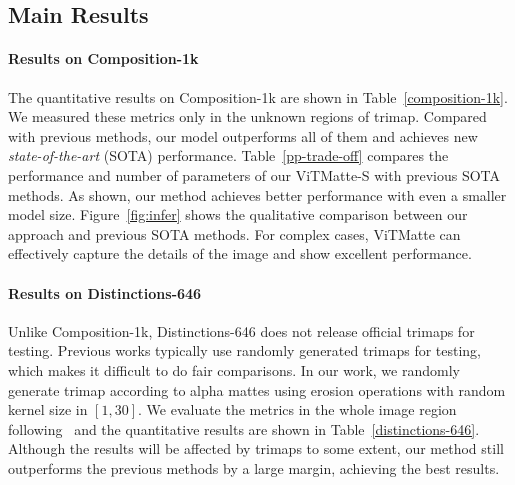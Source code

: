 \documentclass[10pt,twocolumn,letterpaper]{article}
\newcommand{\thename}{ViTMatte}
\begin{document}
\subsection{Main Results}
\paragraph{Results on Composition-1k} The quantitative results on Composition-1k are shown in Table~\ref{composition-1k}. We measured these metrics only in the unknown regions of trimap. Compared with previous methods, our model outperforms all of them and achieves new \emph{state-of-the-art} (SOTA) performance. Table~\ref{pp-trade-off} compares the performance and number of parameters of our \thename-S with previous SOTA methods. As shown, our method achieves better performance with even a smaller model size. Figure~\ref{fig:infer} shows the qualitative comparison between our approach and previous SOTA methods. For complex cases, \thename{} can effectively capture the details of the image and show excellent performance. 

\paragraph{Results on Distinctions-646} Unlike Composition-1k, Distinctions-646 does not release official trimaps for testing. Previous works typically use randomly generated trimaps for testing, which makes it difficult to do fair comparisons. In our work, we randomly generate trimap according to alpha mattes using erosion operations with random kernel size in $[1, 30]$.  We evaluate the metrics in the whole image region following~\cite{HAttMatting} and the quantitative results are shown in Table~\ref{distinctions-646}. Although the results will be affected by trimaps to some extent, our method still outperforms the previous methods by a large margin, achieving the best results.
\end{document}
